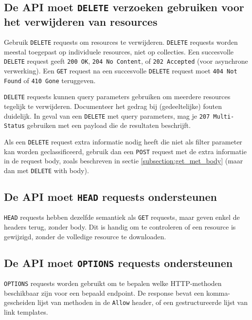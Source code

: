 \subsection{De API moet \texttt{DELETE} verzoeken gebruiken voor het verwijderen van resources}
\label{subsection:delete_requests}

Gebruik \texttt{DELETE} requests om resources te verwijderen. \texttt{DELETE} requests worden meestal toegepast op individuele resources, niet op collecties. Een succesvolle \texttt{DELETE} request geeft \texttt{200 OK}, \texttt{204 No Content}, of \texttt{202 Accepted} (voor asynchrone verwerking). Een \texttt{GET} request na een succesvolle \texttt{DELETE} request moet \texttt{404 Not Found} of \texttt{410 Gone} teruggeven.

\texttt{DELETE} requests kunnen query parameters gebruiken om meerdere resources tegelijk te verwijderen. Documenteer het gedrag bij (gedeeltelijke) fouten duidelijk. In geval van een \texttt{DELETE} met query parameters, mag je \texttt{207 Multi-Status} gebruiken met een payload die de resultaten beschrijft.

Als een \texttt{DELETE} request extra informatie nodig heeft die niet als filter parameter kan worden geclassificeerd, gebruik dan een \texttt{POST} request met de extra informatie in de request body, zoals beschreven in sectie \ref{subsection:get_met_body} (maar dan met \texttt{DELETE} with body).

\subsection{De API moet \texttt{HEAD} requests ondersteunen}
\label{subsection:head_requests}

\texttt{HEAD} requests hebben dezelfde semantiek als \texttt{GET} requests, maar geven enkel de headers terug, zonder body. Dit is handig om te controleren of een resource is gewijzigd, zonder de volledige resource te downloaden.

\subsection{De API moet \texttt{OPTIONS} requests ondersteunen}
\label{subsection:options_requests}

\texttt{OPTIONS} requests worden gebruikt om te bepalen welke HTTP-methoden beschikbaar zijn voor een bepaald endpoint. De response bevat een komma-gescheiden lijst van methoden in de \texttt{Allow} header, of een gestructureerde lijst van link templates.

